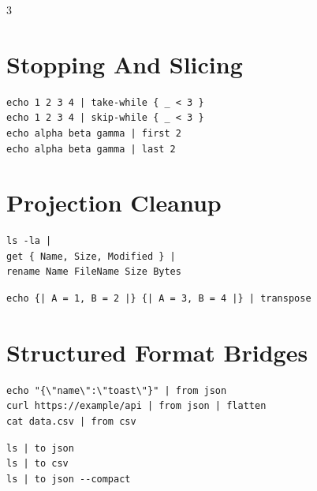 \begin{multicols*}{3}
\section{Stopping And Slicing}
\begin{lstlisting}
echo 1 2 3 4 | take-while { _ < 3 }
echo 1 2 3 4 | skip-while { _ < 3 }
echo alpha beta gamma | first 2
echo alpha beta gamma | last 2
\end{lstlisting}

\columnbreak

\section{Projection Cleanup}
\begin{lstlisting}
ls -la |
get { Name, Size, Modified } |
rename Name FileName Size Bytes
\end{lstlisting}

\begin{lstlisting}
echo {| A = 1, B = 2 |} {| A = 3, B = 4 |} | transpose
\end{lstlisting}


\section{Structured Format Bridges}
\begin{lstlisting}
echo "{\"name\":\"toast\"}" | from json
curl https://example/api | from json | flatten
cat data.csv | from csv
\end{lstlisting}

\begin{lstlisting}
ls | to json
ls | to csv
ls | to json --compact
\end{lstlisting}



\end{multicols*}
